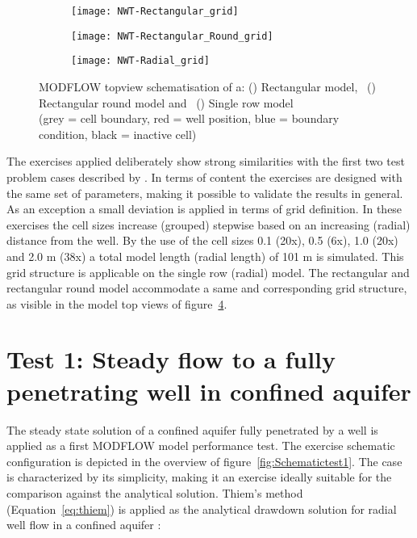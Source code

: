 \begin{figure}[H]
	\centering
	\begin{subfigure}[b]{0.5\linewidth}
		\centering\texttt{[image: NWT-Rectangular\_grid]}
		\captionsetup{justification=centering}		
		\caption{\label{fig:Rectangular model}}
		\end{subfigure}%
	\begin{subfigure}[b]{0.5\linewidth}
        \centering\texttt{[image: NWT-Rectangular\_Round\_grid]}
		\captionsetup{justification=centering}		
		\caption{\label{fig:Rectangular round model}}
		\end{subfigure}
	\begin{subfigure}[b]{\linewidth}
        \centering\texttt{[image: NWT-Radial\_grid]}
		\captionsetup{justification=centering}		
		\caption{\label{fig:Single row model}}
		\end{subfigure}
	\captionsetup{justification=centering}	
	\caption[Modflow topview schematisation of a: () Rectangular model, ~() Rectangular round model and ~() Single row model]{MODFLOW topview schematisation of a: () Rectangular model, ~() Rectangular round model and ~() Single row model \\ (grey = cell boundary, red = well position, blue = boundary condition, black = inactive cell)} 
	\label{fig:Modflowtopview}
\end{figure} 
The exercises applied deliberately show strong similarities with the first two test problem cases described by \citet{Langevin2008}. In terms of content the exercises are designed with the same set of parameters, making it possible to validate the results in general. As an exception a small deviation is applied in terms of grid definition. In these exercises the cell sizes increase (grouped) stepwise based on an increasing (radial) distance from the well. By the use of the cell sizes 0.1 (20x), 0.5 (6x), 1.0 (20x) and 2.0 m (38x) a total model length (radial length) of 101 m is simulated. This grid structure is applicable on the single row (radial) model. The rectangular and rectangular round model accommodate a same and corresponding grid structure, as visible in the model top views of figure~\ref{fig:Modflowtopview}.   

\clearpage\section{Test 1: Steady flow to a fully penetrating well in confined aquifer}
\label{sec:test1}
The steady state solution of a confined aquifer fully penetrated by a well is applied as a first MODFLOW model performance test. The exercise schematic configuration is depicted in the overview of figure~\ref{fig:Schematictest1}. The case is characterized by its simplicity, making it an exercise ideally suitable for the comparison against the analytical solution. Thiem's method (Equation~\ref{eq:thiem}) is applied as the analytical drawdown solution for radial well flow in a confined aquifer \citep{Kruseman2000}:

